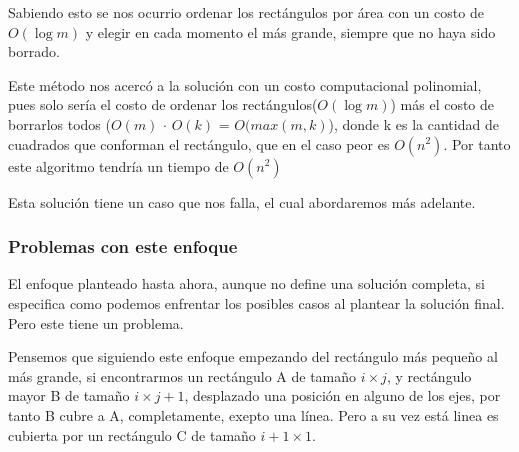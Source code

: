 \documentclass{article}
\begin{document}
Sabiendo esto se nos ocurrio ordenar los rectángulos por área con un costo de $O(\log m)$ y elegir en cada momento el más grande, siempre que no haya sido borrado.


Este método nos acercó a la solución con un costo computacional polinomial, pues solo sería el costo de ordenar los rectángulos($O(\log m)$) más el costo de borrarlos todos ($O(m)$ $\cdot$ $O(k)$ = $O(max (m, k)$), donde k es la cantidad de cuadrados que conforman el rectángulo, que en el caso peor es $O(n^2)$. Por tanto este algoritmo tendría un tiempo de $O(n^2)$

Esta solución tiene un caso que nos falla, el cual abordaremos más adelante.
	\subsubsection{Problemas con este enfoque}
	
	El enfoque planteado hasta ahora, aunque no define una solución completa, si especifica como podemos enfrentar los posibles casos al plantear la solución final. Pero este tiene un problema.

Pensemos que siguiendo este enfoque empezando del rectángulo más pequeño al más grande, si encontrarmos un rectángulo A de tamaño $i \times j$, y rectángulo mayor B de tamaño $i \times j + 1$, desplazado una posición en alguno de los ejes, por tanto B cubre a A, completamente, exepto una línea. Pero a su vez está linea es cubierta por un rectángulo C de tamaño $i + 1 \times 1$.  \\

\begin{center}


\end{center}
\end{document}

